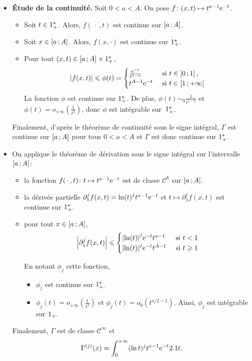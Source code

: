 \begin{demo}
\begin{itemize}
\item \textbf{Étude de la continuité.} Soit $0 < a < A$. On pose $\fonctionligne[f]{(x, t)}{t^{x-1} \e^{-t}}$.
\begin{itemize}
\item Soit $t \in \Rpe$. Alors, $f(\,\cdot\,, t)$ est continue sur $\interff{a}{A}$.

\item Soit $x \in \interff{a}{A}$. Alors, $f(x, \cdot)$ est continue sur $\Rpe$.

\item Pour tout $(x, t) \in \interff{a}{A} \times \Rpe$,
\[
\abs{f(x, t)} \leqslant \phi(t) = 
\begin{cases}
\frac{\e^{-t}}{t^{1-a}} &\text{ si } t \in \interof{0}{1},\\
t^{A-1} \e^{-t} &\text{ si } t \in \interfo{1}{+\infty}
\end{cases}
\]
La fonction $\phi$ est continue sur $\Rpe$. De plus, $\phi(t) \sim_0 \frac{1}{t^{1 - a}}$ et $\phi(t) = o_{+\infty}\mathopen{}\left(\frac{1}{t^2}\right)$, donc $\phi$ est intégrable sur~$\Rpe$.
\end{itemize}
Finalement, d'après le théorème de continuité sous le signe intégral, $\Gamma$ est continue sur $\interff{a}{A}$ pour tous $0 < a < A$ et $\Gamma$ est donc continue sur $\Rpe$.

\item On applique le théorème de dérivation sous le signe intégral sur l'intervalle $\interff{a}{A}$:
\begin{itemize}
\item la fonction $\fonctionligne[f(\,\cdot\,, t)]{t}{t^{x - 1} \e^{-t}}$ est de classe $\mathscr{C}^k$ sur $\interff{a}{A}$.

\item la dérivée partielle $\partial_1^j f(x, t) = \ln(t)^j t^{x - 1} \e^{-t}$ et $t \mapsto \partial_1^j f(x, t)$ est continue sur $\Rpe$.

\item pour tout $x \in \interff{a}{A}$,
\[
\abs{\partial_1^j f(x, t)} \leqslant
\begin{cases}
\abs{\ln(t)}^j \e^{-t} t^{a-1} &\text{ si } t < 1 \\
\abs{\ln(t)}^j \e^{-t} t^{A-1} &\text{ si } t \geqslant 1
\end{cases}
\]

En notant $\phi_j$ cette fonction,
\begin{itemize}
\item $\phi_j$ est continue sur $\Rpe$.
\item $\phi_j(t) = o_{+\infty}\mathopen{}\left(\frac{1}{t^2}\right)$ et $\phi_j(t) = o_0(t^{a/2-1})$. Ainsi, $\phi_j$ est intégrable sur $\Rp$.
\end{itemize}
\end{itemize}
Finalement, $\Gamma$ est de classe $\mathscr{C}^\infty$ et
\[
\Gamma^{(j)}(x) = \int_0^{+\infty} (\ln t)^j t^{x-1} \e^{-t} \d t.
\]
\end{itemize}
\end{demo}

